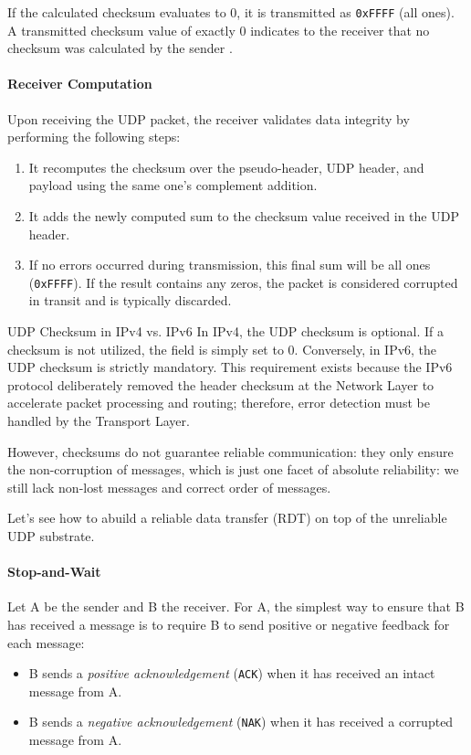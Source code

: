 If the calculated checksum evaluates to \( 0 \), it is transmitted as \texttt{0xFFFF} (all ones). A transmitted checksum value of exactly \( 0 \) indicates to the receiver that no checksum was calculated by the sender \cite{rfc768}.

\paragraph{Receiver Computation}
Upon receiving the UDP packet, the receiver validates data integrity by performing the following steps:
\begin{enumerate}
    \item It recomputes the checksum over the pseudo-header, UDP header, and payload using the same one's complement addition.
    \item It adds the newly computed sum to the checksum value received in the UDP header.
    \item If no errors occurred during transmission, this final sum will be all ones (\texttt{0xFFFF}). If the result contains any zeros, the packet is considered corrupted in transit and is typically discarded.
\end{enumerate}

\begin{note}{UDP Checksum in IPv4 vs. IPv6}
In IPv4, the UDP checksum is optional. If a checksum is not utilized, the field is simply set to \( 0 \). Conversely, in IPv6, the UDP checksum is strictly mandatory. This requirement exists because the IPv6 protocol deliberately removed the header checksum at the Network Layer to accelerate packet processing and routing; therefore, error detection must be handled by the Transport Layer.
\end{note}

However, checksums do not guarantee reliable communication: they only ensure the non-corruption of messages, which is just one facet of absolute reliability: we still lack non-lost messages and correct order of messages.

Let's see how to abuild a reliable data transfer (RDT) on top of the unreliable UDP substrate.

\paragraph{Stop-and-Wait}
Let A be the sender and B the receiver.
For A, the simplest way to ensure that B has received a message is to require B to send positive or negative feedback for each message:
\begin{itemize}
    \item B sends a \emph{positive acknowledgement} (\texttt{ACK}) when it has received an intact message from A.
    \item B sends a \emph{negative acknowledgement} (\texttt{NAK}) when it has received a corrupted message from A.
\end{itemize}

